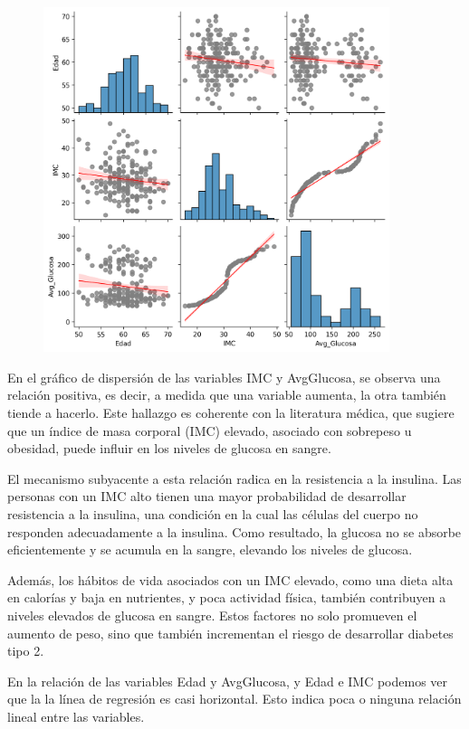 \documentclass[a4paper, 12pt]{article}
\begin{document}
\begin{figure}[H]
    \centering
    \includegraphics[width=0.9\textwidth]{img/matriz_regresion_lineal.png}
\end{figure}

En el gráfico de dispersión de las variables IMC y AvgGlucosa, se observa una relación positiva, es decir, a medida que una variable aumenta, la otra también tiende a hacerlo. Este hallazgo es coherente con la literatura médica, que sugiere que un índice de masa corporal (IMC) elevado, asociado con sobrepeso u obesidad, puede influir en los niveles de glucosa en sangre.

El mecanismo subyacente a esta relación radica en la resistencia a la insulina. Las personas con un IMC alto tienen una mayor probabilidad de desarrollar resistencia a la insulina, una condición en la cual las células del cuerpo no responden adecuadamente a la insulina. Como resultado, la glucosa no se absorbe eficientemente y se acumula en la sangre, elevando los niveles de glucosa.

Además, los hábitos de vida asociados con un IMC elevado, como una dieta alta en calorías y baja en nutrientes, y poca actividad física, también contribuyen a niveles elevados de glucosa en sangre. Estos factores no solo promueven el aumento de peso, sino que también incrementan el riesgo de desarrollar diabetes tipo 2.

En la relación de las variables Edad y AvgGlucosa, y Edad e IMC podemos ver que la la línea de regresión es casi horizontal. Esto indica poca o ninguna relación lineal entre las variables.
\end{document}
